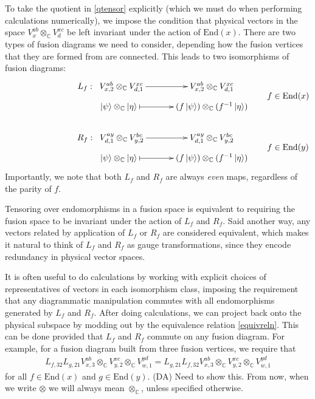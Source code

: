 \documentclass[12pt,a4paper]{article}
\newcommand{\tp}{\otimes}
\newcommand{\cc}{\mathbb{C}}
\newcommand{\End}{\text{End}}
\newcommand{\cl}{\mathbb{C}\ell}
\newcommand{\ket}[1]{\ensuremath{\left|#1\right\rangle}}
\newcommand{\dave}[1]{{\color{ao(english)}\footnotesize{(DA) #1}}}
\begin{document}
To take the quotient in \eqref{qtensor} explicitly (which we must do when performing calculations numerically), we impose the condition that physical vectors in the space $V^{ab}_x \tp_{\mathbb{C}} V^{xc}_d$ be left invariant under the action of $\text{End}(x)$. 
There are two types of fusion diagrams we need to consider, depending how the fusion vertices that they are formed from are connected. This leads to two isomorphisms of fusion diagrams:
\begin{align}
&\vcenter{\xymatrix @!0 @M=1mm @C=42mm{
 &L_f: \; \;V^{ab}_{x,2} \tp_{\mathbb{C}} V^{xc}_{d,1} \ar[r]            & V^{ab}_{x,2} \tp_{\mathbb{C}} V^{xc}_{d,1}  \\
		  &\;\;\;\;\;\;\; \ket{\psi}\tp_\mathbb{C} \ket{\eta}  \ar@{|->}[r] & (f\ket{\psi}) \tp_{\mathbb{C}} (f^{-1} \ket{\eta})  
		  }} \quad \quad f \in \text{End}(x)\\
		  \\		  
&		  \vcenter{\xymatrix @!0 @M=1mm @C=42mm{
		  &R_f: \; \;V^{ay}_{d,1} \tp_{\mathbb{C}} V^{bc}_{y,2} \ar[r]            & V^{ay}_{d,1} \tp_{\mathbb{C}} V^{bc}_{y,2} \\
		  &\;\;\;\;\;\;\; \ket{\psi}\tp_\mathbb{C} \ket{\eta}  \ar@{|->}[r] & (f\ket{\psi}) \tp_{\mathbb{C}} (f^{-1} \ket{\eta})
	}}	\quad \quad f \in \text{End}(y)
	\end{align}
Importantly, we note that both $L_f$ and $R_f$ are always {\it even} maps, regardless of the parity of $f$. 

Tensoring over endomorphisms in a fusion space is equivalent to requiring the fusion space to be invariant under the action of $L_f$ and $R_f$. 
Said another way, any vectors related by application of $L_f$ or $R_f$ are considered equivalent, which makes it natural to think of $L_f$ and $R_f$ as gauge transformations, since they encode redundancy in physical vector spaces.

It is often useful to do calculations %
by working with explicit choices of representatives of vectors in each isomorphism class, imposing the requirement that any diagrammatic manipulation commutes with all endomorphisms generated by $L_f$ and $R_f$. 
After doing calculations, we can project back onto the physical subspace by modding out by the equivalence relation \eqref{equivreln}. 
This can be done provided that $L_f$ and $R_f$ commute on any fusion diagram. For example, for a fusion diagram built from three fusion vertices, we require that
\begin{align}
L_{f, 32}L_{g,21} V^{ab}_{x,3} \tp_{\mathbb{C}} V^{xc}_{y,2} \tp_{\mathbb{C}} V^{yd}_{w,1} = L_{g,21} L_{f, 32} V^{ab}_{x,3} \tp_{\mathbb{C}} V^{xc}_{y,2} \tp_{\mathbb{C}} V^{yd}_{w,1} 
\end{align}
for all $f \in \text{End}(x)$ and $g \in \text{End}(y)$. 
\dave{Need to show this.}
From now, when we write $\tp$ we will always mean $\tp_\cc$, unless specified otherwise.
\end{document}
